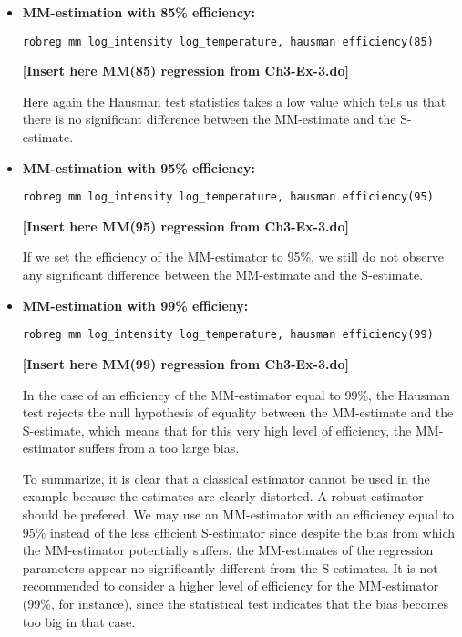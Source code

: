 \begin{stexample}
\begin{itemize}
\item \textbf{MM-estimation with 85\% efficiency:}%

\texttt{robreg mm log\_intensity log\_temperature, hausman efficiency(85)}%


\textbf{[Insert here MM(85) regression from Ch3-Ex-3.do]} 

Here again the Hausman test statistics takes a low value which tells us that
there is no significant difference between the MM-estimate and the S-estimate.

\item \textbf{MM-estimation with 95\% efficiency:}%

\texttt{robreg mm log\_intensity log\_temperature, hausman efficiency(95)}%


\textbf{[Insert here MM(95) regression from Ch3-Ex-3.do]} 

If we set the efficiency of the MM-estimator to 95\%, we still do not observe
any significant difference between the MM-estimate and the S-estimate.

\item \textbf{MM-estimation with 99\% efficieny:}%

\texttt{robreg mm log\_intensity log\_temperature, hausman efficiency(99)}%


\textbf{[Insert here MM(99) regression from Ch3-Ex-3.do]} 

In the case of an efficiency of the MM-estimator equal to 99\%, the Hausman
test rejects the null hypothesis of equality between the MM-estimate and the
S-estimate, which means that for this very high level of efficiency, the
MM-estimator suffers from a too large bias.

To summarize, it is clear that a classical estimator cannot be used in the
example because the  estimates are clearly distorted. A robust estimator
should be prefered. We may use an MM-estimator with an efficiency equal to
95\% instead of the less efficient S-estimator since despite the bias from
which the MM-estimator potentially suffers, the MM-estimates of the regression
parameters appear no significantly different from the S-estimates. It is not
recommended to consider a higher level of efficiency for the MM-estimator
(99\%, for instance), since the statistical test indicates that the bias
becomes too big in that case.
\end{itemize}
\end{stexample}

